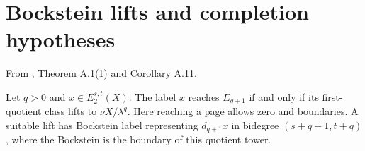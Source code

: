 \section{Bockstein lifts and completion hypotheses}

\begin{theorem}
\label{sem:Literature:finite-bockstein}
From \cite{BHS}, Theorem A.1(1) and Corollary A.11.\par

Let $q>0$ and $x\in E_2^{s,t}(X)$. The label $x$ reaches $E_{q+1}$ if and only if its first-quotient class lifts to $\nu X/\lambda^q$. Here reaching a page allows zero and boundaries. A suitable lift has Bockstein label representing $d_{q+1}x$ in bidegree $(s+q+1,t+q)$, where the Bockstein is the boundary of this quotient tower.
\end{theorem}

